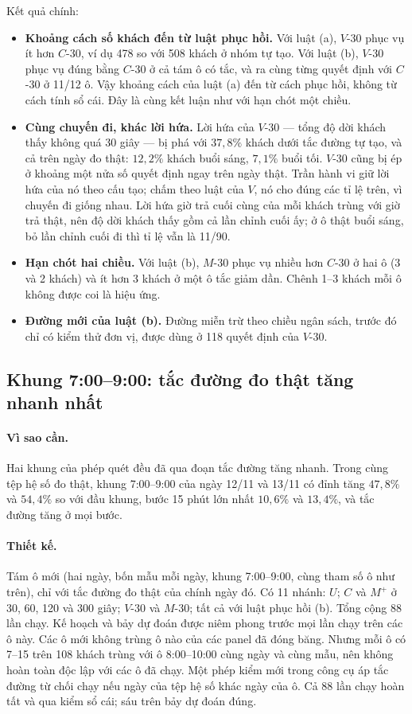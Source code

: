 Kết quả chính:
\begin{itemize}
\item \textbf{Khoảng cách số khách đến từ luật phục hồi.} Với luật (a), $V$-30 phục vụ ít hơn $C$-30, ví dụ 478 so với
508 khách ở nhóm tự tạo. Với luật (b), $V$-30 phục vụ đúng bằng $C$-30 ở cả tám ô có tắc, và ra cùng từng quyết định
với $C$-30 ở 11/12 ô. Vậy khoảng cách của luật (a) đến từ cách phục hồi, không từ cách tính sổ cái. Đây là cùng kết luận
như với hạn chót một chiều.
\item \textbf{Cùng chuyến đi, khác lời hứa.} Lời hứa của $V$-30 --- tổng độ dời khách thấy không quá 30 giây --- bị phá với
$37{,}8\%$ khách dưới tắc đường tự tạo, và cả trên ngày đo thật: $12{,}2\%$ khách buổi sáng, $7{,}1\%$ buổi tối. $V$-30 cũng
bị ép ở khoảng một nửa số quyết định ngay trên ngày thật. Trần hành vi giữ lời hứa của nó theo cấu tạo; chấm theo luật
của $V$, nó cho đúng các tỉ lệ trên, vì chuyến đi giống nhau. Lời hứa giờ trả cuối cùng của mỗi khách trùng với giờ trả
thật, nên độ dời khách thấy gồm cả lần chỉnh cuối ấy; ở ô thật buổi sáng, bỏ lần chỉnh cuối đi thì tỉ lệ vẫn là 11/90.
\item \textbf{Hạn chót hai chiều.} Với luật (b), $M$-30 phục vụ nhiều hơn $C$-30 ở hai ô (3 và 2 khách) và ít hơn 3 khách ở
một ô tắc giảm dần. Chênh 1--3 khách mỗi ô không được coi là hiệu ứng.
\item \textbf{Đường mới của luật (b).} Đường miễn trừ theo chiều ngân sách, trước đó chỉ có kiểm thử đơn vị, được dùng ở 118
quyết định của $V$-30.
\end{itemize}

\subsection{Khung 7:00--9:00: tắc đường đo thật tăng nhanh nhất}

\paragraph{Vì sao cần.} Hai khung của phép quét đều đã qua đoạn tắc đường tăng nhanh. Trong cùng tệp hệ số đo thật, khung
7:00--9:00 của ngày 12/11 và 13/11 có đỉnh tăng $47{,}8\%$ và $54{,}4\%$ so với đầu khung, bước 15 phút lớn nhất $10{,}6\%$ và
$13{,}4\%$, và tắc đường tăng ở mọi bước.

\paragraph{Thiết kế.} Tám ô mới (hai ngày, bốn mẫu mỗi ngày, khung 7:00--9:00, cùng tham số ô như trên), chỉ với tắc đường
đo thật của chính ngày đó. Có 11 nhánh: $U$; $C$ và $M^{+}$ ở 30, 60, 120 và 300 giây; $V$-30 và $M$-30; tất cả với luật phục
hồi (b). Tổng cộng 88 lần chạy. Kế hoạch và bảy dự đoán được niêm phong trước mọi lần chạy trên các ô này. Các ô mới không
trùng ô nào của các panel đã đóng băng. Nhưng mỗi ô có 7--15 trên 108 khách trùng với ô 8:00--10:00 cùng ngày và cùng mẫu,
nên không hoàn toàn độc lập với các ô đã chạy. Một phép kiểm mới trong công cụ áp tắc đường từ chối chạy nếu ngày của tệp
hệ số khác ngày của ô. Cả 88 lần chạy hoàn tất và qua kiểm sổ cái; sáu trên bảy dự đoán đúng.

